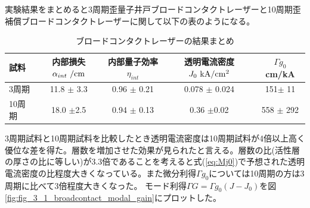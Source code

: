 {実験結果をまとめると3周期歪量子井戸ブロードコンタクトレーザーと10周期歪補償ブロードコンタクトレーザーに関して以下の表のようになる。
\begin{table}[h]
  \caption{ブロードコンタクトレーザーの結果まとめ}
  \label{table:table_I0}
  \centering
  \begin{tabular}{lcccc}
    \hline
    試料   &  内部損失$\alpha_{int}\  \rm{ /cm}$&内部量子効率$\eta_{int} $&透明電流密度 $J_{0} \ \rm{  kA/cm^2}$  &$\Gamma g_{0}$ cm/kA\\
    \hline \hline
     3周期 &   11.8 $\pm$ 3.3 &0.96 $\pm$ 0.21&0.078 $\pm$  0.024& 151$\pm$ 11\\
    10周期 & 18.0 $\pm$2.5&0.94 $\pm$ 0.13&0.36 $\pm$0.02&558 $\pm$ 292\\
    \hline
  \end{tabular}
\end{table}
%

3周期試料と10周期試料を比較したとき透明電流密度は10周期試料が4倍以上高く優位な差を得た。層数を増加させた効果が見られたと言える。層数の比(活性層の厚さの比に等しい)が3.3倍であることを考えると式(\ref{eq:Mj0})で予想された透明電流密度の比程度大きくなっている。また微分利得$\Gamma g_{0}$については10周期の方は3周期に比べて3倍程度大きくなった。
モード利得$\Gamma G=\Gamma g_{0}(J-J_{0})$を図\ref{fig:fig_3_1_broadcontact_modal_gain}にプロットした。

}

